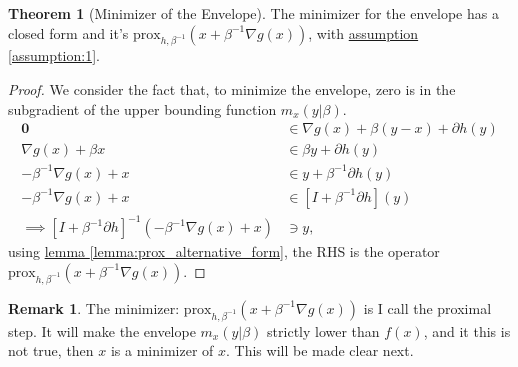 \documentclass[]{article}
\theoremstyle{definition}
\newtheorem{theorem}{Theorem}       %
\newtheorem{remark}{Remark}[subsection]
{
    \newtheorem{assumption}{Assumption}
}
\begin{document}
        \begin{theorem}[Minimizer of the Envelope]\label{thm:minimizer_envelope}
            The minimizer for the envelope has a closed form and it's $\text{prox}_{h, \beta^{-1}}(x + \beta^{-1}\nabla g(x))$, with \hyperref[assumption:1]{assumption \ref*{assumption:1}}. 
        \end{theorem}
        \begin{proof}
            We consider the fact that, to minimize the envelope, zero is in the subgradient of the upper bounding function $m_x(y|\beta)$. 
            \begin{align*}
                \mathbf 0 &\in 
                \nabla g(x) + {\beta}(y - x) + \partial h(y)
                \\
                \nabla g(x) + \beta x & \in
                \beta y + \partial h(y)
                \\
                -\beta^{-1} \nabla g(x) + x &\in y + \beta^{-1} \partial h(y)
                \\
                -\beta^{-1} \nabla g(x) + x &\in [I + \beta^{-1} \partial h](y)
                \\
                \implies
                [I + \beta^{-1}\partial h]^{-1}(- \beta^{-1} \nabla g(x) + x) 
                & \ni y,
            \end{align*}
            using \hyperref[lemma:prox_alternative_form]{lemma \ref*{lemma:prox_alternative_form}}, the RHS is the operator $\text{prox}_{h, \beta^{-1}}(x + \beta^{-1}\nabla g(x))$. 
        \end{proof}
        \begin{remark}
            The minimizer: $\text{prox}_{h, \beta^{-1}}(x + \beta^{-1}\nabla g(x))$ is I call the proximal step. It will make the envelope $m_x(y|\beta)$ strictly lower than $f(x)$, and it this is not true, then $x$ is a minimizer of $x$. This will be made clear next. 
        \end{remark}
\end{document}
